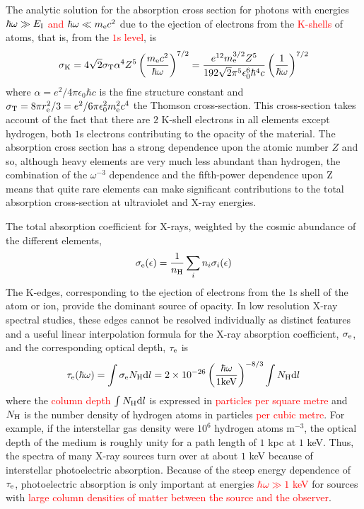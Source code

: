 \documentclass[12pt,a4paper]{article}
\newcommand{\dif}{\mathrm{d}}
\begin{document}
The analytic solution for the absorption cross section for photons with energies \textcolor{red}{$\hbar\omega \gg E_{\rm I}$ and $\hbar\omega \ll m_{\rm e}c^2$} due to the ejection of electrons from the \textcolor{red}{K-shells} of atoms, that is, from the \textcolor{red}{$1$s level}, is
\begin{equation}
\sigma_{\rm K} = 4\sqrt{2} \sigma_{\rm T} \alpha^4 Z^5 \left(\frac{m_{\rm e} c^2}{\hbar \omega} \right)^{7/2} = \frac{e^{12} m_{\rm e}^{3/2} Z^5}{192\sqrt{2} \pi^5 \epsilon_0^6 \hbar^4 c} \left(\frac{1}{\hbar \omega} \right)^{7/2}
\end{equation}
where $\alpha = e^2/4\pi\epsilon_0\hbar c$ is the fine structure constant and $\sigma_{\rm T} = 8\pi r_{\rm e}^2/3 = e^2/6\pi\epsilon_0^2m^2_{\rm e}c^4$ the Thomson cross-section. This cross-section takes account of the fact that there are $2$ K-shell electrons in all elements except hydrogen, both $1$s electrons contributing to the opacity of the material. The absorption cross section has a strong dependence upon the atomic number $Z$ and so, although heavy elements are very much less abundant than hydrogen, the combination of the $\omega^{-3}$ dependence and the fifth-power dependence upon Z means that quite rare elements can make significant contributions to the total absorption cross-section at ultraviolet and X-ray energies. 

The total absorption coefficient for X-rays, weighted by the cosmic abundance of the different elements,
\begin{equation}
\sigma_{\rm e}(\epsilon) = \frac{1}{n_{\rm H}} \sum_i n_i \sigma_i (\epsilon)
\end{equation}
The K-edges, corresponding to the ejection of electrons from the $1$s shell of the atom or ion, provide the dominant source of opacity. In low resolution X-ray spectral studies, these edges cannot be resolved individually as distinct features and a useful linear interpolation formula for the X-ray absorption coefficient, $\sigma_{\rm e}$, and the corresponding optical depth, $\tau_{\rm e}$ is
\begin{equation}
\tau_{\rm e}(\hbar \omega) = \int \sigma_{\rm e} N_{\rm H} \dif l = 2\times 10^{-26} \left( \frac{\hbar \omega}{1 \rm keV} \right)^{-8/3} \int N_{\rm H} \dif l
\end{equation}
where the \textcolor{red}{column depth} $\int N_{\rm H} \dif l$ is expressed in \textcolor{red}{particles per square metre} and $N_{\rm H}$ is the number density of hydrogen atoms in particles \textcolor{red}{per cubic metre}. For example, if the interstellar gas density were $10^6$ hydrogen atoms m$^{-3}$, the optical depth of the medium is roughly unity for a path length of $1$ kpc at $1$ keV. Thus, the spectra of many X-ray sources turn over at about $1$ keV because of interstellar photoelectric absorption. Because of the steep energy dependence of $\tau_{\rm e}$, photoelectric absorption is only important at energies \textcolor{red}{$\hbar\omega \gg 1$ keV} for sources with \textcolor{red}{large column densities of matter between the source and the observer}.



\end{document}
